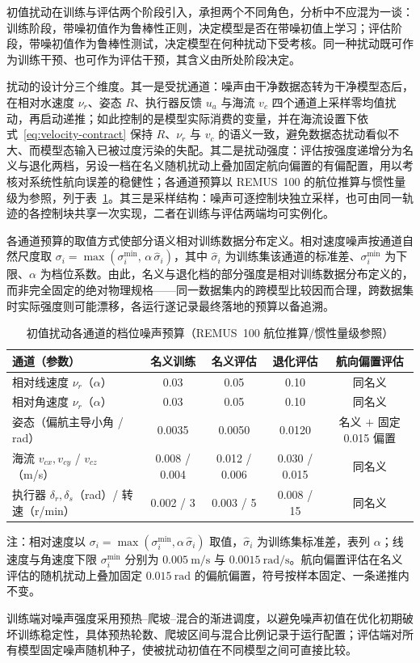 初值扰动在训练与评估两个阶段引入，承担两个不同角色，分析中不应混为一谈：训练阶段，带噪初值作为鲁棒性正则，决定模型是否在带噪初值上学习；评估阶段，带噪初值作为鲁棒性测试，决定模型在何种扰动下受考核。同一种扰动既可作为训练干预、也可作为评估干预，其含义由所处阶段决定。

扰动的设计分三个维度。其一是受扰通道：噪声由干净数据态转为干净模型态后，在相对水速度 \(\nu_r\)、姿态 \(R\)、执行器反馈 \(u_a\) 与海流 \(v_c\) 四个通道上采样零均值扰动，再启动递推；如此控制的是模型实际消费的变量，并在海流设置下依式~\eqref{eq:velocity-contract} 保持 \(R\)、\(\nu_r\) 与 \(v_c\) 的语义一致，避免数据态扰动看似不大、而模型态输入已被过度污染的失配。其二是扰动强度：评估按强度递增分为名义与退化两档，另设一档在名义随机扰动上叠加固定航向偏置的有偏配置，用以考核对系统性航向误差的稳健性；各通道预算以 REMUS~100 的航位推算与惯性量级为参照，列于表~\ref{tab:noise-budget}。其三是采样结构：噪声可逐控制块独立采样，也可由同一轨迹的各控制块共享一次实现，二者在训练与评估两端均可实例化。

各通道预算的取值方式使部分语义相对训练数据分布定义。相对速度噪声按通道自然尺度取 \(\sigma_i=\max(\sigma_i^{\min},\,\alpha\,\hat\sigma_i)\)，其中 \(\hat\sigma_i\) 为训练集该通道的标准差、\(\sigma_i^{\min}\) 为下限、\(\alpha\) 为档位系数。由此，名义与退化档的部分强度是相对训练数据分布定义的，而非完全固定的绝对物理规格——同一数据集内的跨模型比较因而合理，跨数据集时实际强度则可能漂移，各运行遂记录最终落地的预算以备追溯。

\begin{table}[htbp]
  \centering
  \caption{初值扰动各通道的档位噪声预算（REMUS~100 航位推算/惯性量级参照）}
  \label{tab:noise-budget}
  \small
  \begin{tabularx}{\textwidth}{>{\raggedright\arraybackslash}X cccc}
    \toprule
    通道（参数） & 名义训练 & 名义评估 & 退化评估 & 航向偏置评估 \\
    \midrule
    相对线速度 \(\nu_r\)（\(\alpha\)）& 0.03 & 0.05 & 0.10 & 同名义 \\
    相对角速度 \(\nu_r\)（\(\alpha\)）& 0.03 & 0.05 & 0.10 & 同名义 \\
    姿态（偏航主导小角 / rad）& 0.0035 & 0.0050 & 0.0120 & 名义 \(+\) 固定 0.015 偏置 \\
    海流 \(v_{cx},v_{cy}\) / \(v_{cz}\)（m/s）& 0.008 / 0.004 & 0.012 / 0.006 & 0.030 / 0.015 & 同名义 \\
    执行器 \(\delta_r,\delta_s\)（rad）/ 转速（r/min）& 0.002 / 3 & 0.003 / 5 & 0.008 / 15 & 同名义 \\
    \bottomrule
  \end{tabularx}
  \par\vspace{2pt}
  \footnotesize 注：相对速度以 \(\sigma_i=\max(\sigma_i^{\min},\alpha\,\hat\sigma_i)\) 取值，\(\hat\sigma_i\) 为训练集标准差，表列 \(\alpha\)；线速度与角速度下限 \(\sigma_i^{\min}\) 分别为 \(0.005~\mathrm{m/s}\) 与 \(0.0015~\mathrm{rad/s}\)。航向偏置评估在名义评估的随机扰动上叠加固定 \(0.015~\mathrm{rad}\) 的偏航偏置，符号按样本固定、一条递推内不变。
\end{table}

训练端对噪声强度采用预热--爬坡--混合的渐进调度，以避免噪声初值在优化初期破坏训练稳定性，具体预热轮数、爬坡区间与混合比例记录于运行配置；评估端对所有模型固定噪声随机种子，使被扰动初值在不同模型之间可直接比较。
